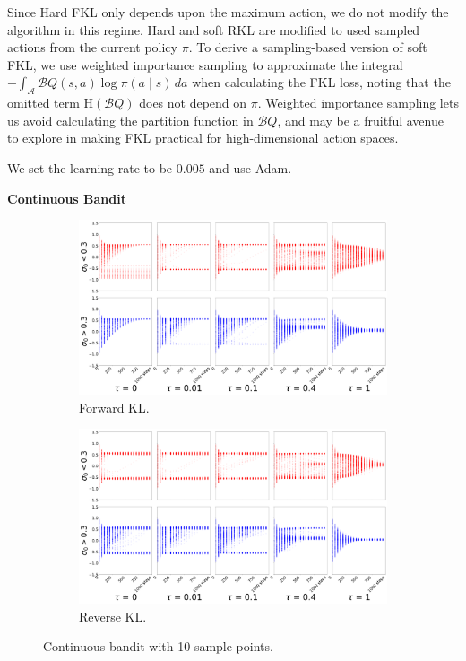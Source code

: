\documentclass{article}
\newcommand{\actionspace}{\mathcal{A}}
\newcommand{\boltzmannQ}{\mathcal{B}Q}
\newcommand{\entropy}{\mathrm{H}}
\begin{document}
Since Hard FKL only depends upon the maximum action, we do not modify the algorithm in this regime. Hard and soft RKL are modified to used sampled actions from the current policy $\pi$. To derive a sampling-based version of soft FKL, we use weighted importance sampling to approximate the integral $-\int_\actionspace \boltzmannQ(s, a) \log \pi(a \mid s)\, da$ when calculating the FKL loss, noting that the omitted term $\entropy(\boltzmannQ)$ does not depend on $\pi$. Weighted importance sampling lets us avoid calculating the partition function in $\boltzmannQ$, and may be a fruitful avenue to explore in making FKL practical for high-dimensional action spaces. 

We set the learning rate to be $0.005$ and use Adam.

\textbf{Continuous Bandit}

\begin{figure}[!htb]
  \centering
  \begin{subfigure}[b]{0.5\linewidth}
    \centering
    \includegraphics[width=0.8\columnwidth]{figs/bandit/monte-carlo/10/mean_forward_optim=adam_modes=1_lr=0.005.png}
    \caption{Forward KL.}
    \label{fig:10-sample-cont-bandit-forward}
  \end{subfigure}%
  \begin{subfigure}[b]{0.5\linewidth}
        \centering
        \includegraphics[width=0.8\columnwidth]{figs/bandit/monte-carlo/10/mean_reverse_optim=adam_modes=1_lr=0.005.png}
        \caption{Reverse KL.}
        \label{fig:10-sample-cont-bandit-reverse}
  \end{subfigure}
  \caption{Continuous bandit with 10 sample points.}
\end{figure}
\end{document}
